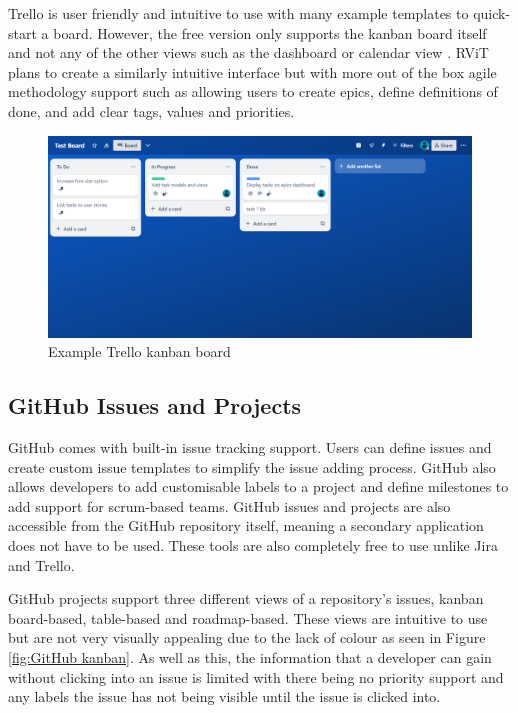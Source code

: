 \documentclass[l4proj.tex]{subfiles}
\begin{document}
Trello is user friendly and intuitive to use with many example templates to quick-start a board. However, the free version only supports the kanban board itself and not any of the other views such as the dashboard or calendar view \cite{TrelloPricing}. RViT plans to create a similarly intuitive interface but with more out of the box agile methodology support such as allowing users to create epics, define definitions of done, and add clear tags, values and priorities.


\begin{figure}[h!]
\begin{center}
\includegraphics[scale=0.35]{dissertation/images/TrelloKanbanBoard.png}
\caption{Example Trello kanban board}
\label{fig:Trello kanban} 
\end{center}
\end{figure}

\subsection{GitHub Issues and Projects}
GitHub comes with built-in issue tracking support. Users can define issues and create custom issue templates to simplify the issue adding process. GitHub also allows developers to add customisable labels to a project and define milestones to add support for scrum-based teams. GitHub issues and projects are also accessible from the GitHub repository itself, meaning a secondary application does not have to be used. These tools are also completely free to use unlike Jira and Trello.


GitHub projects support three different views of a repository's issues, kanban board-based, table-based and roadmap-based. These views are intuitive to use but are not very visually appealing due to the lack of colour as seen in Figure \ref{fig:GitHub kanban}. As well as this, the information that a developer can gain without clicking into an issue is limited with there being no priority support and any labels the issue has not being visible until the issue is clicked into.
\end{document}
